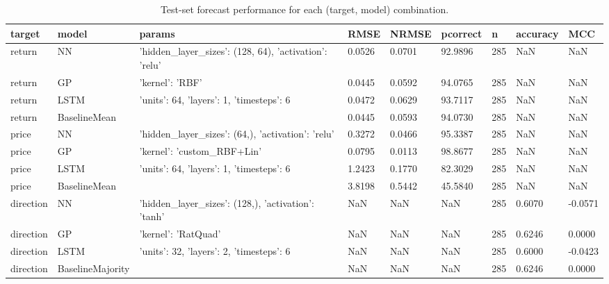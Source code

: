 \begin{table}[H]
\centering
\small
\begin{tabular}{lllllllll}
\toprule
target & model & params & RMSE & NRMSE & pcorrect & n & accuracy & MCC \\
\midrule
return & NN & {'hidden_layer_sizes': (128, 64), 'activation': 'relu'} & 0.0526 & 0.0701 & 92.9896 & 285 & NaN & NaN \\
return & GP & {'kernel': 'RBF'} & 0.0445 & 0.0592 & 94.0765 & 285 & NaN & NaN \\
return & LSTM & {'units': 64, 'layers': 1, 'timesteps': 6} & 0.0472 & 0.0629 & 93.7117 & 285 & NaN & NaN \\
return & BaselineMean & {} & 0.0445 & 0.0593 & 94.0730 & 285 & NaN & NaN \\
price & NN & {'hidden_layer_sizes': (64,), 'activation': 'relu'} & 0.3272 & 0.0466 & 95.3387 & 285 & NaN & NaN \\
price & GP & {'kernel': 'custom_RBF+Lin'} & 0.0795 & 0.0113 & 98.8677 & 285 & NaN & NaN \\
price & LSTM & {'units': 64, 'layers': 1, 'timesteps': 6} & 1.2423 & 0.1770 & 82.3029 & 285 & NaN & NaN \\
price & BaselineMean & {} & 3.8198 & 0.5442 & 45.5840 & 285 & NaN & NaN \\
direction & NN & {'hidden_layer_sizes': (128,), 'activation': 'tanh'} & NaN & NaN & NaN & 285 & 0.6070 & -0.0571 \\
direction & GP & {'kernel': 'RatQuad'} & NaN & NaN & NaN & 285 & 0.6246 & 0.0000 \\
direction & LSTM & {'units': 32, 'layers': 2, 'timesteps': 6} & NaN & NaN & NaN & 285 & 0.6000 & -0.0423 \\
direction & BaselineMajority & {} & NaN & NaN & NaN & 285 & 0.6246 & 0.0000 \\
\bottomrule
\end{tabular}
\caption{Test-set forecast performance for each (target, model) combination.}
\label{tab:ex2_metrics}
\end{table}
